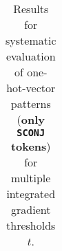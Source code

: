 \begin{table}[t]
\begin{tabular}{lllllll}

\\ \hline
\end{tabular}
\caption[Model Evaluation for only \texttt{SCONJ} tokens]{Results for systematic evaluation of one-hot-vector patterns (\textbf{only \texttt{SCONJ} tokens}) for multiple integrated gradient thresholds $t$.}
\label{tab:evalResultsSCONJ}
\end{table}
	